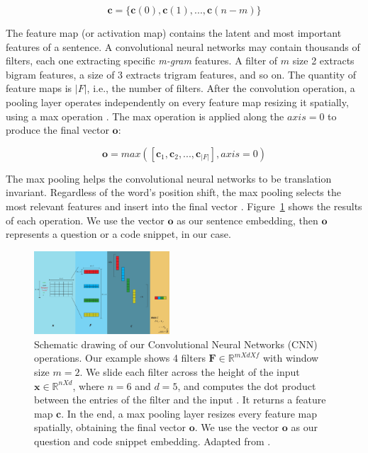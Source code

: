 \documentclass[sigconf]{acmart}
\begin{document}
\begin{equation}
    \bm{c} = \{ \bm{c}(0), \bm{c}(1), . . ., \bm{c}(n - m) \} 
\end{equation}

The feature map (or activation map) contains the latent and most important features of a sentence. A convolutional neural networks may contain thousands of filters, each one extracting specific \emph{m-gram} features. A filter of $m$ size 2 extracts bigram features, a size of 3 extracts trigram features, and so on. The quantity of feature maps is $|F|$, i.e., the number of filters. After the convolution operation, a pooling layer operates independently on every feature map resizing it spatially, using a max operation \cite{karpathy-course-cnn-2016}.  The max operation is applied along the $axis=0$ to produce the final vector $\bm{o}$:

\begin{equation}
    \bm{o} = max\left(\left[\bm{c}_{1}, \bm{c}_{2}, . . ., \bm{c}_{|F|}\right], axis = 0\right)
\end{equation}

The max pooling helps the convolutional neural networks to be translation invariant. Regardless of the word's position shift, the max pooling selects the most relevant features and insert into the final vector \citep{tom-young:trends-deep-learning-nlp}. Figure~\ref{fig:cnn-steps-word-embedding} shows the results of each operation. We use the vector $\bm{o}$ as our sentence embedding, then $\bm{o}$ represents a question or a code snippet, in our case. 

\begin{figure}[H]
    \centering
    \includegraphics[width=0.45\textwidth]{figuras/cnn-steps-word-embedding-article.pdf}
    \caption{Schematic drawing of our Convolutional Neural Networks (CNN) operations. Our example shows 4 filters $\bm{F} \in \mathbb{R}^{m X d X f}$ with window size $m = 2$. We slide each filter across the height of the input $\bm{x} \in \mathbb{R}^{n X d}$, where $n = 6$ and $d = 5$, and computes the dot product between the entries of the filter and the input \cite{karpathy-course-cnn-2016}. It returns a feature map $\bm{c}$. In the end, a max pooling layer resizes every feature map spatially, obtaining the final vector $\bm{o}$. We use the vector $\bm{o}$ as our question and code snippet embedding. Adapted from \cite{zhang-guide-convolutional-cnn-embedding-ilustration:2015}.}
    \label{fig:cnn-steps-word-embedding}
\end{figure}
\end{document}
